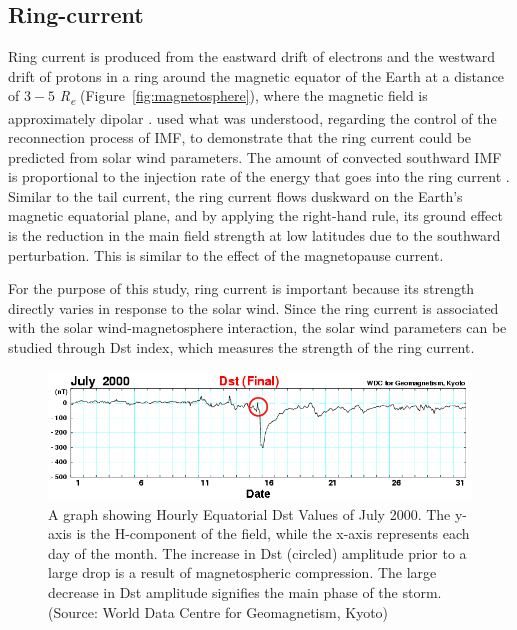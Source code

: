 \documentclass[12pt]{report} %
\begin{document}
\subsection{Ring-current} \label{sec:ring}
 
Ring current is produced from the eastward drift of electrons and the westward drift of protons in a ring around the magnetic equator of the Earth at a distance of $3-5$ \textit{R\textsubscript{e}} (Figure~\ref{fig:magnetosphere}), where the magnetic field is approximately dipolar \citep{men11}. \cite{burton75} used what was understood, regarding the control of the reconnection process of IMF, to demonstrate that the ring current could be predicted from solar wind parameters. The amount of convected southward IMF is proportional to the injection rate of the energy that goes into the ring current \citep{le04}. Similar to the tail current, the ring current flows duskward on the Earth's magnetic equatorial plane, and by applying the right-hand rule, its ground effect is the reduction in the main field strength at low latitudes due to the southward perturbation. This is similar to the effect of the magnetopause current. 

For the purpose of this study, ring current is important because its strength directly varies in response to the solar wind. Since the ring current is associated with the solar wind-magnetosphere interaction, the solar wind parameters can be studied through Dst index, which measures the strength of the ring current. 

\begin{figure}
\centering
 \vspace{-5pt}
    \includegraphics[width=1\textwidth]{./dst}
 \vspace{-15pt}
  \caption{A graph showing Hourly Equatorial Dst Values of July 2000. The y-axis is the H-component of the field, while the x-axis represents each day of the month. The increase in Dst (circled) amplitude prior to a large drop is a result of magnetospheric compression. The large decrease in Dst amplitude signifies the main phase of the storm. (Source: World Data Centre for Geomagnetism, Kyoto)} \label{fig:dst}
   \vspace{0pt}
\end{figure} 
\end{document}
